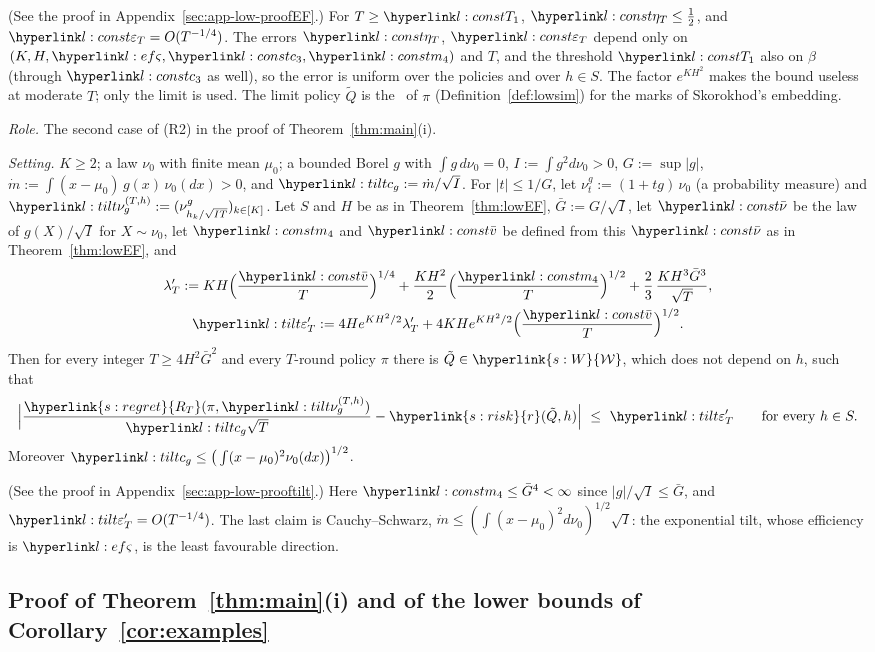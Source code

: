 \documentclass[11pt]{article}
\newcommand{\dt}[1]{\hypertarget{#1}{}}
\DeclareRobustCommand{\sy}[2]{{\hyperlink{#1}{#2}}}
\newcommand{\1}{\mathbf{1}}
\newcommand{\RT}{\sy{s:regret}{R_T}}
\newcommand{\Wc}{\sy{s:W}{\mathcal W}}
\newcommand{\rk}{\sy{s:risk}{r}}
\begin{document}
\noindent(See the proof in Appendix~\ref{sec:app-low-proofEF}.) For $T\ge\lTone$, $\letT\le\frac12$, and $\lepT=O(T^{-1/4})$. The errors $\letT$, $\lepT$ depend only on $(K,H,\lsd,\lcth,\lmq)$ and $T$, and the threshold $\lTone$ also on $\beta$
(through $\lcth$ as well), so the error is uniform over the policies and over $h\in S$. The factor $e^{KH^2}$ makes the bound useless at moderate $T$; only the limit is used. The limit policy $\tilde Q$
is the \lsimpol\ of $\pi$ (Definition~\ref{def:lowsim}) for the marks of Skorokhod's embedding.

\begin{proposition}\label{prop:lowtilt}\dt{l:tilt}
\textit{Role.} The second case of (R2) in the proof of Theorem~\ref{thm:main}(i).

\noindent\textit{Setting.} $K\ge2$; a law $\nu_0$ with finite mean $\mu_0$; a bounded Borel $g$ with $\int g\,d\nu_0=0$, $I:=\int g^2d\nu_0>0$, $G:=\sup|g|$,
$\dot m:=\int(x-\mu_0)\,g(x)\,\nu_0(dx)>0$, and $\lcg:=\dot m/\sqrt I$. For $|t|\le1/G$, let $\nu^g_t:=(1+tg)\,\nu_0$ (a probability measure) and
$\lnug:=(\nu^g_{h_k/\sqrt{IT}})_{k\in[K]}$. Let $S$ and $H$ be as in Theorem~\ref{thm:lowEF}, $\bar G:=G/\sqrt I$, let $\lnub$ be the law of $g(X)/\sqrt I$ for $X\sim\nu_0$, let
$\lmq$ and $\lvb$ be defined from this $\lnub$ as in Theorem~\ref{thm:lowEF}, and
\begin{gather*}
\lambda'_T:=KH\Big(\frac{\lvb}T\Big)^{1/4}+\frac{KH^2}2\Big(\frac{\lmq}T\Big)^{1/2}+\frac23\,\frac{KH^3\bar G^3}{\sqrt T},\\
\lepTp:=4He^{KH^2/2}\lambda'_T+4KHe^{KH^2/2}\Big(\frac{\lvb}T\Big)^{1/2}.
\end{gather*}
Then for every integer $T\ge4H^2\bar G^2$ and every $T$-round policy $\pi$ there is $\tilde Q\in\Wc$, which does not depend on $h$, such that
\[
\Big|\frac{\RT(\pi,\lnug)}{\lcg\sqrt T}-\rk(\tilde Q,h)\Big|\ \le\ \lepTp\qquad\text{for every }h\in S .
\]
Moreover $\lcg\le\big(\int(x-\mu_0)^2\nu_0(dx)\big)^{1/2}$.
\end{proposition}
\noindent(See the proof in Appendix~\ref{sec:app-low-prooftilt}.) Here $\lmq\le\bar G^4<\infty$ since $|g|/\sqrt I\le\bar G$, and $\lepTp=O(T^{-1/4})$. The last claim is
Cauchy--Schwarz, $\dot m\le(\int(x-\mu_0)^2d\nu_0)^{1/2}\sqrt I$: the exponential tilt, whose efficiency is $\lsd$, is the least favourable direction.

\subsection{Proof of Theorem~\ref{thm:main}(i) and of the lower bounds of Corollary~\ref{cor:examples}}\label{sec:app-low-main}
\end{document}
